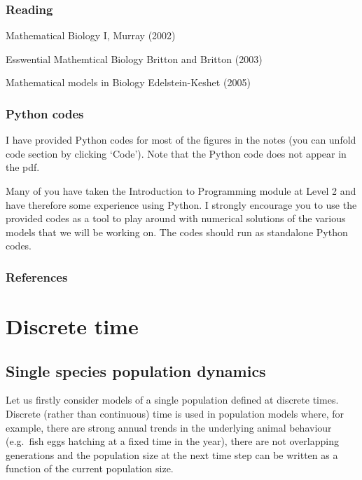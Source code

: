 \documentclass[
  letterpaper,
  DIV=11,
  numbers=noendperiod]{scrreprt}
\begin{document}
\hypertarget{reading}{%
\section*{Reading}\label{reading}}


Mathematical Biology I, Murray (2002)

Esswential Mathemtical Biology Britton and Britton (2003)

Mathematical models in Biology Edelstein-Keshet (2005)

\hypertarget{python-codes}{%
\section*{Python codes}\label{python-codes}}


I have provided Python codes for most of the figures in the notes (you
can unfold code section by clicking `Code'). Note that the Python code
does not appear in the pdf.

Many of you have taken the Introduction to Programming module at Level 2
and have therefore some experience using Python. I strongly encourage
you to use the provided codes as a tool to play around with numerical
solutions of the various models that we will be working on. The codes
should run as standalone Python codes.

\hypertarget{references}{%
\section*{References}\label{references}}


\part{Discrete time}

\hypertarget{single-species-population-dynamics}{%
\chapter{Single species population
dynamics}\label{single-species-population-dynamics}}

Let us firstly consider models of a single population defined at
discrete times. Discrete (rather than continuous) time is used in
population models where, for example, there are strong annual trends in
the underlying animal behaviour (e.g.~fish eggs hatching at a fixed time
in the year), there are not overlapping generations and the population
size at the next time step can be written as a function of the current
population size.
\end{document}

